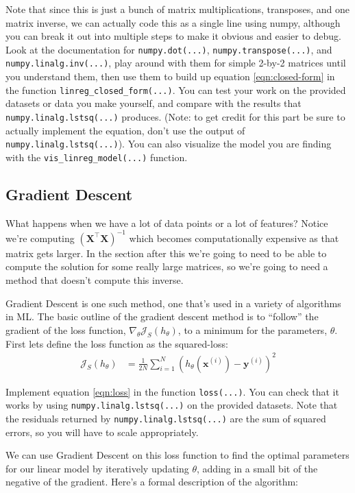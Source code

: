 \documentclass{article} %
\begin{document}
Note that since this is just a bunch of matrix multiplications, transposes, and one matrix inverse, we can actually code this
as a single line using numpy, although you can break it out into multiple steps to make it obvious and easier to debug. Look 
at the documentation for \texttt{numpy.dot(...)}, \texttt{numpy.transpose(...)}, and \texttt{numpy.linalg.inv(...)}, play 
around with them for simple 2-by-2 matrices until you understand them, then use them to build up equation 
\ref{eqn:closed-form} in the function \texttt{linreg\_closed\_form(...)}. You can test your work on the provided datasets or 
data you make yourself, and compare with the results that \texttt{numpy.linalg.lstsq(...)} produces. (Note: to get credit for 
this part be sure to actually implement the equation, don't use the output of \texttt{numpy.linalg.lstsq(...)}). You can also 
visualize the model you are finding with the \texttt{vis\_linreg\_model(...)} function.

\subsection*{Gradient Descent}
What happens when we have a lot of data points or a lot of features? Notice we're computing 
\(\left(\mathbf{X}^\top\mathbf{X}\right)^{-1}\) 
which becomes computationally expensive as that matrix gets larger. In the section after this we're going to need to be able 
to compute the solution for some really large matrices, so we're going to need a method that doesn't compute this inverse.

Gradient Descent is one such method, one that's used in a variety of algorithms in ML. The basic outline of the gradient 
descent method is to ``follow'' the gradient of the loss function, \(\nabla_\theta \mathcal{J}_S(h_\theta)\), to a minimum for the 
parameters, \(\theta\). First lets define the loss function as the squared-loss:
\begin{align}
	\mathcal{J}_S(h_\theta) &= \frac{1}{2N} \sum_{i=1}^N \left(h_\theta(\mathbf{x}^{(i)})-\mathbf{y}^{(i)}\right)^2 \label{eqn:loss}
\end{align}

Implement equation \ref{eqn:loss} in the function \texttt{loss(...)}. You can check that it works by using 
\texttt{numpy.linalg.lstsq(...)} on the provided datasets. Note that the residuals returned by 
\texttt{numpy.linalg.lstsq(...)} are the sum of squared errors, so you will have to scale appropriately.

We can use Gradient Descent on this loss function to find the optimal parameters for our linear model by iteratively updating 
\(\theta\), adding in a small bit of the negative of the gradient. Here's a formal description of the algorithm:
\end{document}
